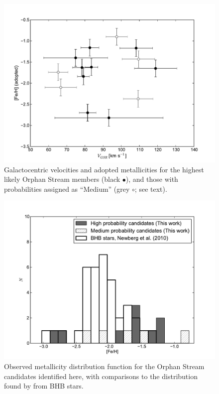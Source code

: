 \begin{figure}[h!]
	\includegraphics[width=\columnwidth]{./chapter2/fig5.pdf}
	\caption{Galactocentric velocities and adopted metallicities for the highest likely Orphan Stream members (black $\bullet$), and those with probabilities assigned as ``Medium'' (grey $\circ$; see text).}
	\label{fig:vgsr-feh}
\end{figure}

\begin{figure}[h!]
	\includegraphics[width=\columnwidth]{./chapter2/fig6.pdf}
	\caption{Observed metallicity distribution function for the Orphan Stream candidates identified here, with comparisons to the distribution found by \citet{Newberg_et-al_2010} from BHB stars.}
	\label{fig:newberg-feh}
\end{figure}

